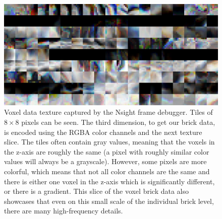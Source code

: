 \begin{figure}[H]
    \centering
    \includegraphics[width=\linewidth]{figures/voxel_memory_view.png}
    \caption{Voxel data texture captured by the Nsight frame debugger. Tiles of $8\times 8$ pixels can be seen. The third dimension, to get our brick data, is encoded using the RGBA color channels and the next texture slice. The tiles often contain gray values, meaning that the voxels in the z-axis are roughly the same (a pixel with roughly similar color values will always be a grayscale). However, some pixels are more colorful, which means that not all color channels are the same and there is either one voxel in the z-axis which is significantly different, or there is a gradient. This slice of the voxel brick data also showcases that even on this small scale of the individual brick level, there are many high-frequency details.}
    \label{fig:vdb_asset:memory_view}
\end{figure}


